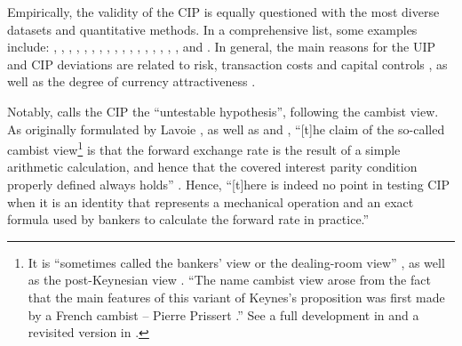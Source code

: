 \documentclass[a4paper, twoside]{templates/ociamthesis}
\begin{document}
Empirically, the validity of the CIP is equally questioned with the most diverse datasets and quantitative methods. In a comprehensive list, some examples include: \textcite{officer1970}, \textcite{taylor1987}, \textcite{fletcher1996}, \textcite{balke1998}, \textcite{peel2002}, \textcite{moosa2004}, \textcite{sarno2005}, \textcite{akram2008}, \textcite{griffoli2010}, \textcite{fong2010}, \textcite{skinner2011}, \textcite{frenkel2015}, \textcite{borio2016}, \textcite{moosa2017}, \textcite{cieplinski2018}, \textcite{augustin2020}, \textcite{cerutti2021}, \textcite{moessner2021} and \textcite{marcal2021}. In general, the main reasons for the UIP and CIP deviations are related to risk, transaction costs and capital controls \autocite{bekaert2017}, as well as the degree of currency attractiveness \autocite{dupuy2021}.

Notably, \textcite{moosa2017} calls the CIP the ``untestable hypothesis'', following the cambist view. As originally formulated by Lavoie \autocite*{lavoie2000,lavoie2002}, as well as \textcite{smithin2002} and \textcite{harvey2004}, ``{[}t{]}he claim of the so-called cambist view\footnote{It is ``sometimes called the bankers' view or the dealing-room view'' \autocite[ 20]{lavoie2021}, as well as the post-Keynesian view \autocite[ 473]{moosa2017}. ``The name cambist view arose from the fact that the main features of this variant of Keynes's proposition was first made by a French cambist -- Pierre Prissert \autocite*{prissert1972,prissert1972a}.'' \autocite[ 21]{lavoie2021} See a full development in \textcite{lavoie2014} and a revisited version in \textcite{lavoie2021}.} is that the forward exchange rate is the result of a simple arithmetic calculation, and hence that the covered interest parity condition properly defined always holds'' \autocite[ 14]{lavoie2021}. Hence, ``{[}t{]}here is indeed no point in testing CIP when it is an identity that represents a mechanical operation and an exact formula used by bankers to calculate the forward rate in practice.'' \autocite[ 483]{moosa2017}
\end{document}
